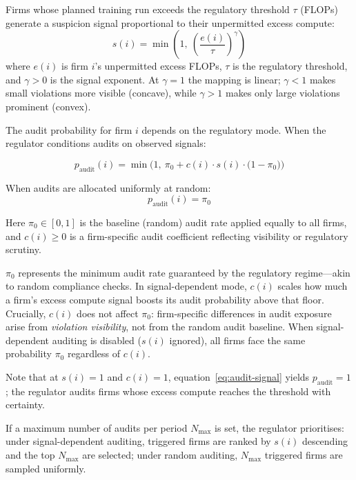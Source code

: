 Firms whose planned training run exceeds the regulatory threshold $\tau$ (FLOPs) generate a suspicion signal proportional to their unpermitted excess compute:
\begin{equation}
    s(i) = \min\!\left(1,\ \left(\frac{e(i)}{\tau}\right)^{\!\gamma}\right)
    \label{eq:signal}
\end{equation}
where $e(i)$ is firm $i$'s unpermitted excess FLOPs, $\tau$ is the regulatory threshold, and $\gamma > 0$ is the signal exponent. At $\gamma = 1$ the mapping is linear; $\gamma < 1$ makes small violations more visible (concave), while $\gamma > 1$ makes only large violations prominent (convex).


The audit probability for firm $i$ depends on the regulatory mode. When the regulator conditions audits on observed signals:

\begin{equation}
    p_{\text{audit}}(i) = \min\!\Big(1,\ \pi_0 + c(i)\cdot s(i)\cdot\big(1 - \pi_0\big)\Big)
    \label{eq:audit-signal}
\end{equation}


When audits are allocated uniformly at random:
\begin{equation}
    p_{\text{audit}}(i) = \pi_0
    \label{eq:audit-random}
\end{equation}

Here $\pi_0 \in [0,1]$ is the baseline (random) audit rate applied equally to all firms, and $c(i) \geq 0$ is a firm-specific audit coefficient reflecting visibility or regulatory scrutiny.

$\pi_0$ represents the minimum audit rate guaranteed by the regulatory regime---akin to random compliance checks. In signal-dependent mode, $c(i)$ scales how much a firm's excess compute signal boosts its audit probability above that floor. Crucially, $c(i)$ does not affect $\pi_0$: firm-specific differences in audit exposure arise from \emph{violation visibility}, not from the random audit baseline. When signal-dependent auditing is disabled ($s(i)$ ignored), all firms face the same probability $\pi_0$ regardless of $c(i)$.

Note that at $s(i) = 1$ and $c(i) = 1$, equation~\eqref{eq:audit-signal} yields $p_{\text{audit}} = 1$; the regulator audits firms whose excess compute reaches the threshold with certainty.


If a maximum number of audits per period $N_{\max}$ is set, the regulator prioritises: under signal-dependent auditing, triggered firms are ranked by $s(i)$ descending and the top $N_{\max}$ are selected; under random auditing, $N_{\max}$ triggered firms are sampled uniformly.


